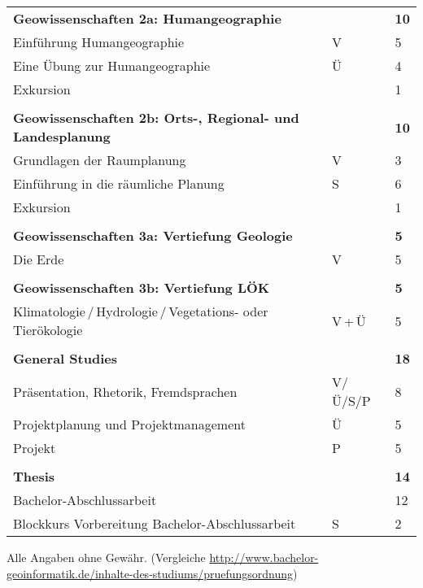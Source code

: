 \begin{longtable}{p{} p{} p{}}
\textbf{Geowissenschaften 2a: Humangeographie} & & \textbf{10}\\
Einführung Humangeographie & V & 5\\
Eine Übung zur Humangeographie & Ü & 4\\
Exkursion & & 1\\
&&\\
\textbf{Geowissenschaften 2b: Orts-, Regional- und Landesplanung} & & \textbf{10}\\
Grundlagen der Raumplanung & V & 3\\
Einführung in die räumliche Planung & S & 6\\
Exkursion & & 1\\
&&\\
\textbf{Geowissenschaften 3a: Vertiefung Geologie} & & \textbf{5}\\
Die Erde & V & 5\\
&&\\
\textbf{Geowissenschaften 3b: Vertiefung LÖK} & & \textbf{5}\\
Klimatologie\,/\,Hydrologie\,/\,Vegetations- oder Tierökologie& V\,+\,Ü & 5\\
&&\\
\textbf{General Studies} & & \textbf{18}\\
Präsentation, Rhetorik, Fremdsprachen & V/Ü/S/P & 8\\
Projektplanung und Projektmanagement & Ü & 5\\
Projekt & P & 5\\
&&\\
\textbf{Thesis} & & \textbf{14}\\
Bachelor-Abschlussarbeit & & 12\\
Blockkurs Vorbereitung Bachelor-Abschlussarbeit & S & 2\\

\end{longtable}

Alle Angaben ohne Gewähr. (Vergleiche \url{http://www.bachelor- geoinformatik.de/inhalte-des-studiums/pruefungsordnung})

\newpage


